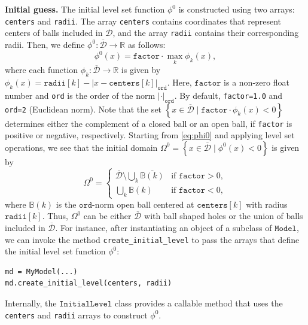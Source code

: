 \documentclass[preprint,9pt]{elsarticle}
\begin{document}
\vspace*{0.5cm}
\noindent \textbf{Initial guess.}
The initial level set function $\phi^0$ is constructed
using two arrays: \texttt{centers} and \texttt{radii}.
The array \texttt{centers} contains coordinates that
represent centers of balls included in $\mathcal{D}$,
and the array \texttt{radii} contains their corresponding radii.
Then, we define $\phi^0\colon\mathcal{\overline{D}}\to\mathds{R}$ as follows:
\begin{equation}\label{eq:phi0}
	\phi^0(x)=\texttt{factor}\cdot\max_k \phi_k(x),	
\end{equation}
where each function $\phi_k\colon\overline{\mathcal{D}}\to\mathds{R}$ is given by
$
	\phi_k(x)=\texttt{radii}[k] -
	|x-\texttt{centers}[k]|_{\texttt{ord}}. 
$
Here, $\texttt{factor}$ is a non-zero float number and \texttt{ord}
is the order of the norm $\left|\cdot\right|_{\texttt{ord}}$.
By default, \texttt{factor=1.0} and \texttt{ord=2} (Euclidean norm).
Note that the set
$
	\left\{x\in\overline{\mathcal{D}}\mid\texttt{factor}\cdot\phi_k(x)<0\right\}
$
determines either the complement of a closed ball
or an open ball, if \texttt{factor} is positive or negative, respectively.
Starting from \eqref{eq:phi0} and applying level set operations,
we see that the initial domain
$
	\Omega^0=\left\{x\in\overline{\mathcal{D}}\mid\phi^0(x)<0\right\}
$
is given by
\[
	\Omega^0 = 
	\begin{cases}
	\overline{\mathcal{D}}\setminus\bigcup_k \overline{\mathbb{B}(k)}
		& \text{if } \texttt{factor} > 0, \\
	\bigcup_k \mathbb{B}(k)
		& \text{if } \texttt{factor} < 0,
	\end{cases}
\]
where $\mathbb{B}(k)$ is the $\texttt{ord}$-norm open ball
centered at $\texttt{centers}[k]$ with radius $\texttt{radii}[k]$.
Thus, $\Omega^0$ can be either
$\overline{\mathcal{D}}$ with ball shaped holes
or the union of balls included in $\overline{\mathcal{D}}$.
For instance, after instantiating an object of a subclass of $\texttt{Model}$,
we can invoke the method \texttt{create\_initial\_level} to pass
the arrays that define the initial level set function $\phi^0$:
\begin{lstlisting}
md = MyModel(...)
md.create_initial_level(centers, radii)	
\end{lstlisting}
Internally, the $\texttt{InitialLevel}$ class
provides a callable method that uses the
\texttt{centers} and \texttt{radii} arrays to construct $\phi^0$.
\end{document}
